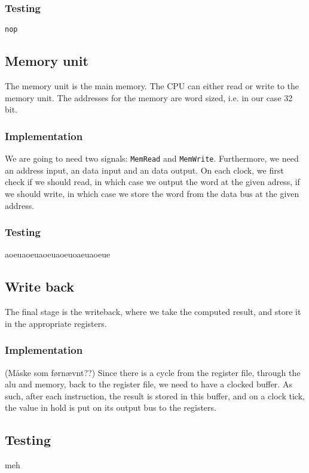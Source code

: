 \subsubsection*{Testing}
\texttt{nop}

\subsection{Memory unit}
The memory unit is the main memory. The CPU can either read or write to the
memory unit. The addresses for the memory are word sized, i.e. in our case 32
bit.

\subsubsection*{Implementation}
We are going to need two signals: \texttt{MemRead} and \texttt{MemWrite}.
Furthermore, we need an address input, an data input and an data output. On
each clock, we first check if we should read, in which case we output the word
at the given adress, if we should write, in which case we store the word from
the data bus at the given address.

\subsubsection*{Testing}
aoeuaoeuaoeuaoeuoaeuaoeue

\subsection{Write back}
The final stage is the writeback, where we take the computed result, and store
it in the appropriate registers.

\subsubsection*{Implementation}
(Måske som førnævnt??) Since there is a cycle from the register file, through
the alu and memory, back to the register file, we need to have a clocked
buffer. As such, after each instruction, the result is stored in this buffer,
and on a clock tick, the value in hold is put on its output bus to the
registers.

\subsection*{Testing}
meh
